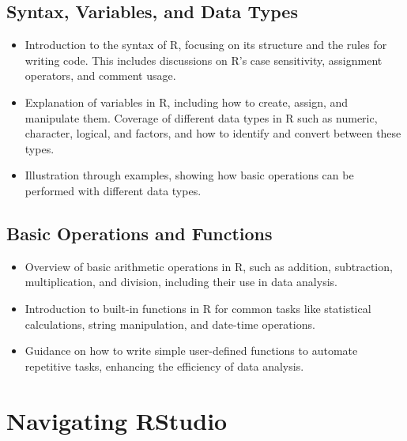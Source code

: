 \documentclass[
]{book}
\begin{document}
\hypertarget{syntax-variables-and-data-types}{%
\subsection*{Syntax, Variables, and Data Types}\label{syntax-variables-and-data-types}}

\begin{itemize}
\item
  Introduction to the syntax of R, focusing on its structure and the rules for writing code. This includes discussions on R's case sensitivity, assignment operators, and comment usage.
\item
  Explanation of variables in R, including how to create, assign, and manipulate them. Coverage of different data types in R such as numeric, character, logical, and factors, and how to identify and convert between these types.
\item
  Illustration through examples, showing how basic operations can be performed with different data types.
\end{itemize}

\hypertarget{basic-operations-and-functions}{%
\subsection*{Basic Operations and Functions}\label{basic-operations-and-functions}}

\begin{itemize}
\item
  Overview of basic arithmetic operations in R, such as addition, subtraction, multiplication, and division, including their use in data analysis.
\item
  Introduction to built-in functions in R for common tasks like statistical calculations, string manipulation, and date-time operations.
\item
  Guidance on how to write simple user-defined functions to automate repetitive tasks, enhancing the efficiency of data analysis.
\end{itemize}

\hypertarget{navigating-rstudio}{%
\section*{Navigating RStudio}\label{navigating-rstudio}}
\end{document}
